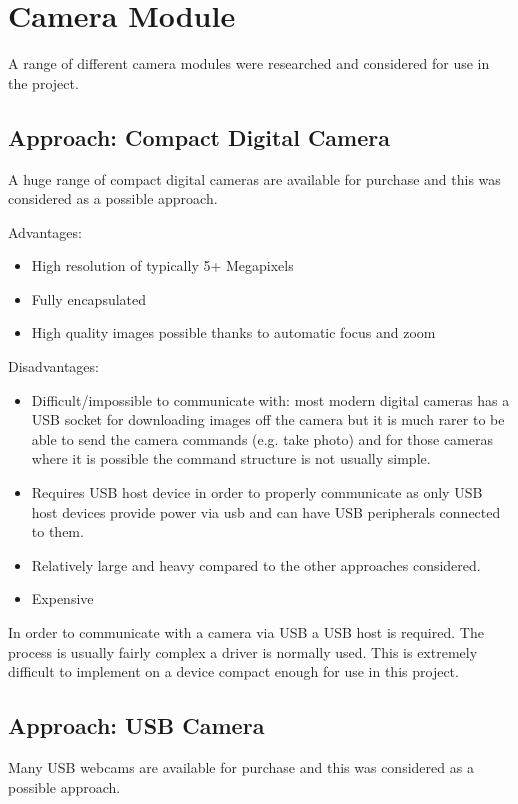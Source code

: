 \section{Camera Module}
\label{sec:John_options}

A range of different camera modules were researched and considered for use in the project.

\subsection{Approach: Compact Digital Camera}
\label{sec:Compact_option}
A huge range of compact digital cameras are available for purchase and this was considered as a possible approach.

Advantages:
      \begin{itemize}
         \item High resolution of typically 5+ Megapixels
		 \item Fully encapsulated
		 \item High quality images possible thanks to automatic focus and zoom
     \end{itemize}

Disadvantages:
     \begin{itemize}
        \item Difficult/impossible to communicate with: most modern digital cameras has a USB socket for downloading images off the camera but it is much rarer to be able to send the camera commands (e.g. take photo) and for those cameras where it is possible the command structure is not usually simple.
        \item Requires USB host device in order to properly communicate as only USB host devices provide power via usb and can have USB peripherals connected to them.
	\item Relatively large and heavy compared to the other approaches considered.
	\item Expensive
     \end{itemize}

In order to communicate with a camera via USB a USB host is required. The process is usually fairly complex a driver is normally used. This is extremely difficult to implement on a device compact enough for use in this project.

\subsection{Approach: USB Camera}
\label{sec:USB_option}
Many USB webcams are available for purchase and this was considered as a possible approach.

